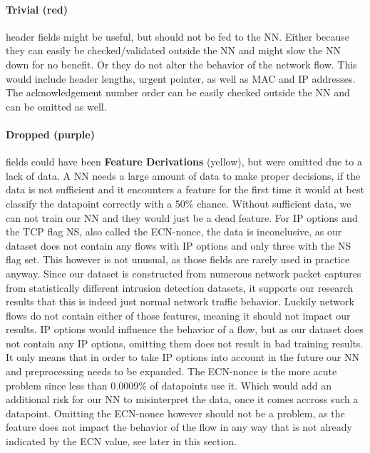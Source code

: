 \documentclass[
	ngerman,
	ruledheaders=section,%
	class=report,%
	thesis={type=bachelor},%
	accentcolor=9c,%
	custommargins=true,%
	marginpar=false,%
	parskip=half-,%
	fontsize=11pt,%
]{tudapub}
\begin{document}
\paragraph{\colorbox{trivial}{\textbf{Trivial} (red)}} header fields might be useful, but should not be fed to the NN.
Either because they can easily be checked/validated outside the NN and might slow the NN down for no benefit.
Or they do not alter the behavior of the network flow.
This would include header lengths, urgent pointer, as well as MAC and IP addresses.
The acknowledgement number order can be easily checked outside the NN and can be omitted as well.

\paragraph{\colorbox{dropped}{\textbf{Dropped} (purple)}} fields could have been \colorbox{derivation}{\textbf{Feature Derivations} (yellow)}, but were omitted due to a lack of data.
A NN needs a large amount of data to make proper decisions, if the data is not sufficient and it encounters a feature for the first time it would at best classify the datapoint correctly with a 50\% chance.
Without sufficient data, we can not train our NN and they would just be a dead feature.
For IP options and the TCP flag NS, also called the ECN-nonce, the data is inconclusive,
as our dataset does not contain any flows with IP options and only three with the NS flag set.
This however is not unusual, as those fields are rarely used in practice anyway.
Since our dataset is constructed from numerous network packet captures from statistically different intrusion detection datasets,
it supports our research results that this is indeed just normal network traffic behavior.
Luckily network flows do not contain either of those features, meaning it should not impact our results.
IP options would influence the behavior of a flow, but as our dataset does not contain any IP options, omitting them does not result in bad training results.
It only means that in order to take IP options into account in the future our NN and preprocessing needs to be expanded.
The ECN-nonce is the more acute problem since less than 0.0009\% of datapoints use it. %
Which would add an additional risk for our NN to misinterpret the data, once it comes accross such a datapoint.
Omitting the ECN-nonce however should not be a problem, as the feature does not impact the behavior of the flow in any way that is not already indicated by the ECN value, see later in this section.
\end{document}

